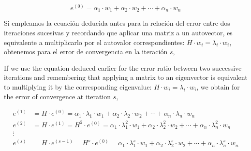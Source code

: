 \begin{equation*}
e^{(0)}=\alpha_1\cdot w_1+\alpha_2\cdot w_2+\cdots+\alpha_n\cdot w_n
\end{equation*}

\begin{paracol}{2}
Si empleamos la ecuación deducida antes para la relación del error entre dos iteraciones sucesivas y recordando que aplicar una matriz a un autovector, es equivalente a multiplicarlo por el autovalor correspondientes: $H\cdot w_i=\lambda_i\cdot w_i$, obtenemos para el error de convergencia en la iteración $s$,

\switchcolumn
If we use the equation deduced earlier for the error ratio between two successive iterations and remembering that applying a matrix to an eigenvector is equivalent to multiplying it by the corresponding eigenvalue: $H\cdot w_i=\lambda_i\cdot w_i$, we obtain for the error of convergence at iteration $s$,
\end{paracol}



\begin{align*}
e^{(1)}&=H\cdot e^{(0)}=\alpha_1\cdot \lambda_1 \cdot  w_1+\alpha_2\cdot \lambda_2 \cdot  w_2+\cdots+\alpha_n\cdot \lambda_n \cdot w_n\\
e^{(2)}&=H\cdot e^{(1)}=H^2\cdot e^{(0)}=\alpha_1\cdot \lambda_1^2 \cdot  w_1+\alpha_2\cdot \lambda_2^2 \cdot  w_2+\cdots+\alpha_n\cdot \lambda_n^2 \cdot w_n\\
\vdots \ \ \ & \\
e^{(s)}&=H\cdot e^{(s-1)}=H^s\cdot e^{(0)}=\alpha_1\cdot \lambda_1^s \cdot  w_1+\alpha_2\cdot \lambda_2^s \cdot  w_2+\cdots+\alpha_n\cdot \lambda_n^s \cdot w_n
\end{align*}

